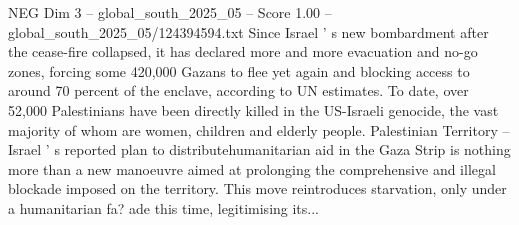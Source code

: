 \begin{textsample}{NEG Dim 3 – global\_south\_2025\_05 – Score 1.00 – global\_south\_2025\_05/124394594.txt}
Since Israel ' s new bombardment after the cease-fire collapsed, it has declared more and more evacuation and no-go zones, forcing some 420,000 Gazans to flee yet again and blocking access to around 70 percent of the enclave, according to UN estimates.
To date, over 52,000 Palestinians have been directly killed in the US-Israeli genocide, the vast majority of whom are women, children and elderly people.
Palestinian Territory -- Israel ' s reported plan to distributehumanitarian aid in the Gaza Strip is nothing more than a new manoeuvre aimed at prolonging the comprehensive and illegal blockade imposed on the territory.
This move reintroduces starvation, only under a humanitarian fa? ade this time, legitimising its...

\end{textsample}
